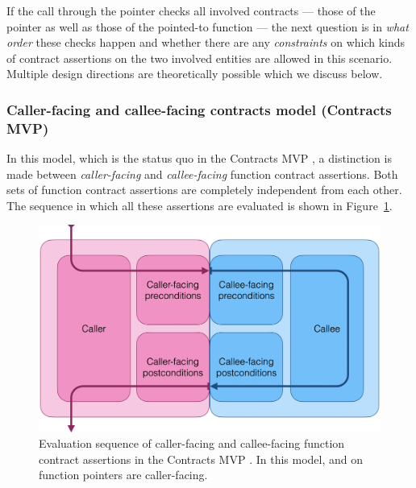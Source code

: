 If the call through the pointer checks all involved contracts --- those of the pointer as well as those of the pointed-to function --- the next question is in \emph{what order} these checks happen and whether there are any \emph{constraints} on which kinds of contract assertions on the two involved entities are allowed in this scenario. Multiple design directions are theoretically possible which we discuss below.


\subsubsection{Caller-facing and callee-facing contracts model (Contracts MVP)}

In this model, which is the status quo in the Contracts MVP \cite{P2900R9}, a distinction is made between \emph{caller-facing} and \emph{callee-facing} function contract assertions. Both sets of function contract assertions are completely independent from each other. The sequence in which all these assertions are evaluated is shown in Figure~\ref{fig:callercallee}.

\begin{figure}[tb]
\begin{center}
\includegraphics[scale=0.29]{images/D2900R9-callercallee}
\end{center}
\caption{Evaluation sequence of caller-facing and callee-facing function contract assertions in the Contracts MVP \cite{P2900R9}. In this model,  and  on function pointers are caller-facing.}
\label{fig:callercallee}
\end{figure}

